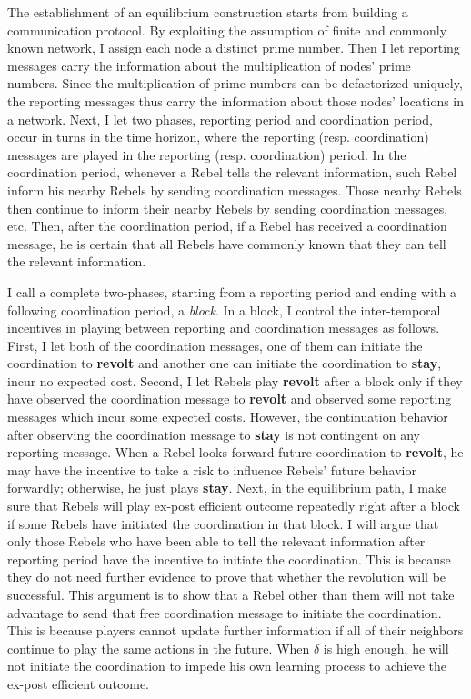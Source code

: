 \documentclass[12pt,letter]{article}
\theoremstyle{definition}
\theoremstyle{remark}
\theoremstyle{claim}
\begin{document}
The establishment of an equilibrium construction starts from building a communication protocol. By exploiting the assumption of finite and commonly known network, I assign each node a distinct prime number. Then I let reporting messages carry the information about the multiplication of nodes' prime numbers. Since the multiplication of prime numbers can be defactorized uniquely, the reporting messages thus carry the information about those nodes' locations in a network. Next, I let two phases, reporting period and coordination period, occur in turns in the time horizon, where the reporting (resp. coordination) messages are played in the reporting (resp. coordination) period. In the coordination period, whenever a Rebel tells the relevant information, such Rebel inform his nearby Rebels by sending coordination messages. Those nearby Rebels then continue to inform their nearby Rebels by sending coordination messages, etc. Then, after the coordination period, if a Rebel has received a coordination message, he is certain that all Rebels have commonly known that they can tell the relevant information. 

I call a complete two-phases, starting from a reporting period and ending with a following coordination period, a \textit{block}.  In a block, I control the inter-temporal incentives in playing between reporting and coordination messages as follows. First, I let both of the coordination messages, one of them can initiate the coordination to \textbf{revolt} and another one can initiate the coordination to \textbf{stay}, incur no expected cost. Second, I let Rebels play \textbf{revolt} after a block only if they have observed the coordination message to \textbf{revolt} and observed some reporting messages  which incur some expected costs. However, the continuation behavior after observing the coordination message to \textbf{stay} is not contingent on any reporting message. When a Rebel looks forward future coordination to \textbf{revolt}, he may have the incentive to take a risk to influence Rebels' future behavior forwardly; otherwise, he just plays \textbf{stay}. Next, in the equilibrium path, I make sure that Rebels will play ex-post efficient outcome repeatedly right after a block if some Rebels have initiated the coordination in that block. I will argue that only those Rebels who have been able to tell the relevant information after reporting period have the incentive to initiate the coordination. This is because they do not need further evidence to prove that whether the revolution will be successful. This argument is to show that a Rebel other than them will not take advantage to send that free coordination message to initiate the coordination. This is because players cannot update further information if all of their neighbors continue to play the same actions in the future. When $\delta$ is high enough, he will not initiate the coordination to impede his own learning process to achieve the ex-post efficient outcome.
\end{document}

